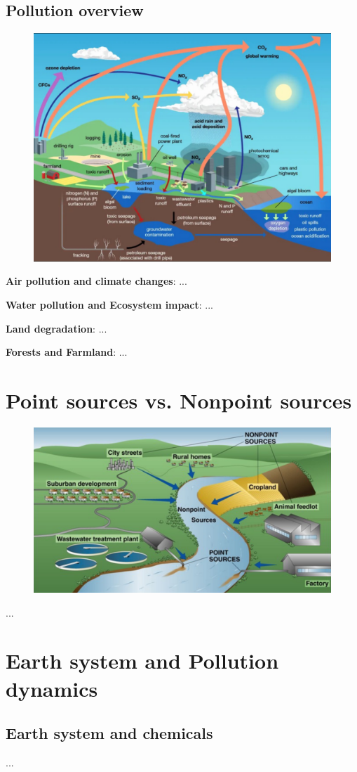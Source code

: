 \documentclass{article}
\newcommand{\cfig}[1]{%
  \begin{figure}[ht!]%
    \centering%
    #1%
  \end{figure}%
}
\begin{document}
\subsection{Pollution overview}
\cfig{\includegraphics*[width=.8\textwidth]{media/pollution-overview.png}}

\textbf{Air pollution and climate changes}:
...

\textbf{Water pollution and Ecosystem impact}:
...

\textbf{Land degradation}:
...

\textbf{Forests and Farmland}:
...

\section{Point sources vs. Nonpoint sources}
\cfig{\includegraphics*[width=.8\textwidth]{media/Point-and-nonpoint.png}}

...

\section{Earth system and Pollution dynamics}
\subsection{Earth system and chemicals}
...
\end{document}

